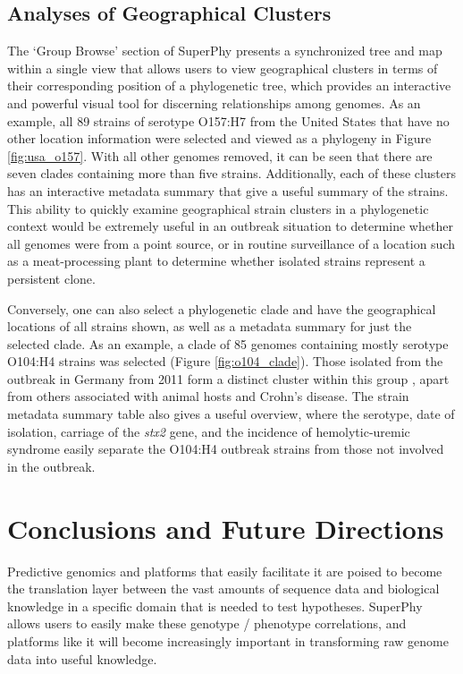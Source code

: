 \documentclass[doublespacing, linenumbers]{bmcart}
\begin{document}
\subsection{Analyses of Geographical Clusters}
The `Group Browse' section of SuperPhy presents a synchronized tree and map within a single view that allows users to view geographical clusters in terms of their corresponding position of a phylogenetic tree, which provides an interactive and powerful visual tool for discerning relationships among genomes. As an example, all 89 strains of serotype O157:H7 from the United States that have no other location information were selected and viewed as a phylogeny in Figure \ref{fig:usa_o157}.  With all other genomes removed, it can be seen that there are seven clades containing more than five strains. Additionally, each of these clusters has an interactive metadata summary that give a useful summary of the strains. This ability to quickly examine geographical strain clusters in a phylogenetic context would be extremely useful in an outbreak situation to determine whether all genomes were from a point source, or in routine surveillance of a location such as a meat-processing plant to determine whether isolated strains represent a persistent clone. 

Conversely, one can also select a phylogenetic clade and have the geographical locations of all strains shown, as well as a metadata summary for just the selected clade. As an example, a clade of 85 genomes containing mostly serotype O104:H4 strains was selected (Figure \ref{fig:o104_clade}). Those isolated from the outbreak in Germany from 2011 form a distinct cluster within this group \cite{mellmann_prospective_2011}, apart from others associated with animal hosts and Crohn's disease. The strain metadata summary table also gives a useful overview, where the serotype, date of isolation, carriage of the \textit{stx2} gene, and the incidence of hemolytic-uremic syndrome easily separate the O104:H4 outbreak strains from those not involved in the outbreak. 

\section{Conclusions and Future Directions}
Predictive genomics and platforms that easily facilitate it are poised to become the translation layer between the vast amounts of sequence data and biological knowledge in a specific domain that is needed to test hypotheses. SuperPhy allows users to easily make these genotype / phenotype correlations, and platforms like it will become increasingly important in transforming raw genome data into useful knowledge. 
\end{document}
